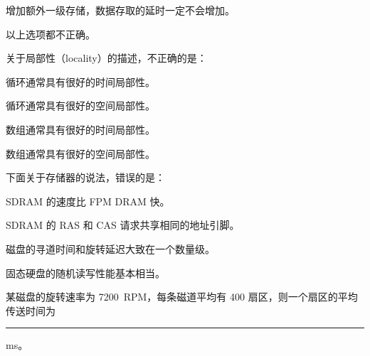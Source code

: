 \begin{problems}
\begin{choices}
            \item 增加额外一级存储，数据存取的延时一定不会增加。
            \item 以上选项都不正确。
        \end{choices}
         关于局部性（locality）的描述，不正确的是：
        \begin{choices}
            \item 循环通常具有很好的时间局部性。
            \item 循环通常具有很好的空间局部性。
            \item 数组通常具有很好的时间局部性。
            \item 数组通常具有很好的空间局部性。
        \end{choices}
         下面关于存储器的说法，错误的是：
        \begin{choices}
            \item SDRAM 的速度比 FPM DRAM 快。
            \item SDRAM 的 RAS 和 CAS 请求共享相同的地址引脚。
            \item 磁盘的寻道时间和旋转延迟大致在一个数量级。
            \item 固态硬盘的随机读写性能基本相当。
        \end{choices}
         某磁盘的旋转速率为 \SI{7200}{RPM}，每条磁道平均有 400 扇区，则一个扇区的平均传送时间为 \rule{2.5cm}{0.25mm} ms。
    \end{problems}